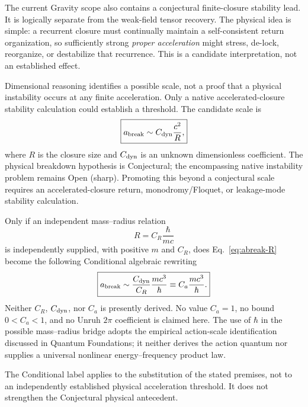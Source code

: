 \documentclass[11pt]{article}
\newcommand{\cmc}{c}
\theoremstyle{plain}
\theoremstyle{remark}
\begin{document}
The current Gravity scope also contains a conjectural finite-closure stability lead.  It
is logically separate from the weak-field tensor recovery.  The physical idea is simple:
a recurrent closure must continually maintain a self-consistent return organization, so
sufficiently strong \emph{proper acceleration} might stress, de-lock, reorganize, or
destabilize that recurrence.  This is a candidate interpretation, not an established
effect.

Dimensional reasoning identifies a possible scale, not a proof that a
physical instability occurs at any finite acceleration.  Only a native
accelerated-closure stability calculation could establish a threshold.
The candidate scale is
\begin{equation}
\boxed{
a_{\rm break}\sim C_{\rm dyn}\frac{\cmc^2}{R},}
\label{eq:abreak-R}
\end{equation}
where $R$ is the closure size and $C_{\rm dyn}$ is an unknown dimensionless coefficient.
The physical breakdown hypothesis is Conjectural; the encompassing
native instability problem remains Open (sharp).  Promoting this beyond a
conjectural scale requires an accelerated-closure return,
monodromy/Floquet, or leakage-mode stability calculation.

Only if an independent mass--radius relation
\begin{equation}
R=C_R\frac{\hbar}{m\cmc}
\label{eq:mass-radius}
\end{equation}
is independently supplied, with positive $m$ and $C_R$, does
Eq.~\eqref{eq:abreak-R} become the following Conditional algebraic rewriting
\begin{equation}
\boxed{
a_{\rm break}
\sim
\frac{C_{\rm dyn}}{C_R}\frac{m\cmc^3}{\hbar}
\equiv C_a\frac{m\cmc^3}{\hbar}.}
\label{eq:abreak-m}
\end{equation}
Neither $C_R$, $C_{\rm dyn}$, nor $C_a$ is presently derived.  No value $C_a=1$, no bound
$0<C_a<1$, and no Unruh $2\pi$ coefficient is claimed here.
The use of $\hbar$ in the possible mass--radius bridge adopts the empirical
action-scale identification discussed in Quantum Foundations; it neither
derives the action quantum nor supplies a universal nonlinear
energy--frequency product law.

The Conditional label applies to the substitution of the stated premises,
not to an independently established physical acceleration threshold.  It does
not strengthen the Conjectural physical antecedent.
\end{document}
